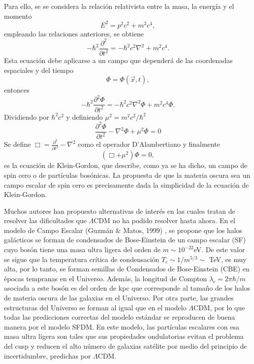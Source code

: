 \documentclass[a4paper,openright,12pt]{book}
\begin{document}
Para ello, se se considera la relación relativista entre la masa, la energía y el momento
\begin{equation}
E^{2} = p^{2}c^{2} + m^{2}c^{4},\label{eqn 1.48}
\end{equation}
empleando las relaciones anteriores, se obtiene
\begin{equation}
-\hbar^{2}\frac{\partial^{2}}{\partial t^{2}} = -\hbar^{2}c^{2}\nabla^{2}
+m^{2}c^{4}.\label{eqn 1.49}
\end{equation}
Esta ecuación debe aplicarse a un campo que dependerá de las coordenadas espaciales y del tiempo
\begin{equation}
\Phi = \Phi(\vec{x},t),\label{eqn 1.50}
\end{equation}
entonces
\begin{equation}
-\hbar^{2}\frac{\partial^{2}\Phi}{\partial t^{2}} = -\hbar^{2}c^{2}\nabla^{2}\Phi
+m^{2}c^{4}\Phi.\label{eqn 1.51}
\end{equation}
Dividiendo por $\hbar^{2}c^{2}$ y definiendo $\mu^{2} = m^{2}c^{2}/\hbar^{2}$
\begin{equation}
\frac{\partial^{2}\Phi}{\partial t^{2}} -\nabla^{2}\Phi + \mu^{2}\Phi = 0\label{eqn 1.52}
\end{equation}
Se define $\Box = \frac{\partial^{2}}{\partial t^{2}} -\nabla^{2} $ como el operador D'Alambertiano y finalmente
\begin{equation}
(\Box +\mu^{2})\Phi = 0,\label{eqn 1.53}
\end{equation}
es la ecuación de Klein-Gordon, que describe, como ya se ha dicho, un campo de spin cero o de partículas bosónicas. La propuesta de que la materia oscura sea un campo escalar de spin cero es precisamente dada la simplicidad de la ecuación de Klein-Gordon.  

Muchos autores han propuesto alternativas de interés en las cuales tratan de resolver las dificultades que $\Lambda$CDM no ha podido resolver hasta ahora. En el modelo de Campo Escalar (Guzmán \& Matos, 1999) \cite{Siddhartha Matos}, se propone que los halos galácticos se forman de condensados de Bose-Einstein de un campo escalar (SF) cuyo bosón tiene una masa ultra ligera del orden de $m \sim 10^{-22}$eV. De este valor se sigue que la temperatura crítica de condensación $T_{c} \sim 1/m^{5/3} \sim $ TeV, es muy alta, por lo tanto, se forman semillas de Condensados de Bose-Einstein (CBE) en épocas tempranas en el Universo. Además, la longitud de Compton $\lambda_{c} = 2\pi \hbar / m$ asociada a este bosón es del orden de kpc que corresponde al tamaño de los halos de materia oscura de las galaxias en el Universo. Por otra parte, las grandes estructuras del Universo se forman al igual que en el modelo $\Lambda$CDM, por lo que todas las predicciones correctas del modelo estándar se reproducen de buena manera por el modelo SFDM. En este modelo, las partículas escalares con esa masa ultra ligera son tales que sus propiedades ondulatorias evitan el problema del cusp y reducen el alto número de galaxias satélite por medio del principio de incertidumbre, predichas por $\Lambda$CDM.
\end{document}
